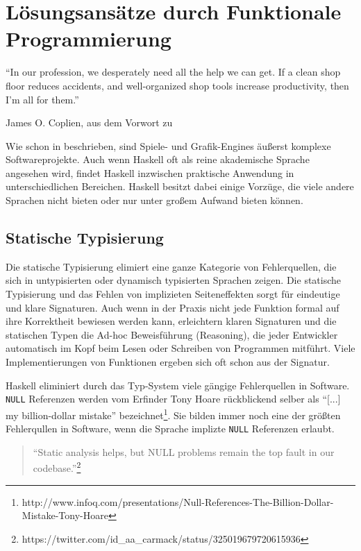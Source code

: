\chapter{Lösungsansätze durch Funktionale Programmierung}\label{chap:loesungen-durch-fp}

\epigraph{"`In our profession, we desperately need all the help we can get. If a clean shop floor reduces accidents, and well-organized shop tools increase productivity, then I’m all for them."'}{James O. Coplien, aus dem Vorwort zu }

Wie schon in  beschrieben, sind Spiele- und Grafik-Engines äußerst komplexe Softwareprojekte. Auch wenn Haskell oft als reine akademische Sprache angesehen wird, findet Haskell inzwischen praktische Anwendung in unterschiedlichen Bereichen. Haskell besitzt dabei einige Vorzüge, die viele andere Sprachen nicht bieten oder nur unter großem Aufwand bieten können.

\section{Statische Typisierung}\label{sec:statische-typisierung}

Die statische Typisierung elimiert eine ganze Kategorie von Fehlerquellen, die sich in untypisierten oder dynamisch typisierten Sprachen zeigen. Die statische Typisierung und das Fehlen von implizieten Seiteneffekten sorgt für eindeutige und klare Signaturen. Auch wenn in der Praxis nicht jede Funktion formal auf ihre Korrektheit bewiesen werden kann, erleichtern klaren Signaturen und die statischen Typen die Ad-hoc Beweisführung (Reasoning), die jeder Entwickler automatisch im Kopf beim Lesen oder Schreiben von Programmen mitführt. Viele Implementierungen von Funktionen ergeben sich oft schon aus der Signatur.

Haskell eliminiert durch das Typ-System viele gängige Fehlerquellen in Software. \texttt{NULL} Referenzen werden vom Erfinder Tony Hoare rückblickend selber als "`[...] my billion-dollar mistake"' bezeichnet\footnote{http://www.infoq.com/presentations/Null-References-The-Billion-Dollar-Mistake-Tony-Hoare}. Sie bilden immer noch eine der größten Fehlerqullen in Software, wenn die Sprache implizte \texttt{NULL} Referenzen erlaubt. 

\begin{quote}
"`Static analysis helps, but NULL problems remain the top fault in our codebase."'\footnote{\label{note:carmack-null}https://twitter.com/id\_aa\_carmack/status/325019679720615936}
\end{quote}

